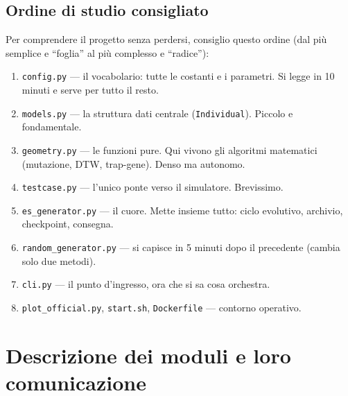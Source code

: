 \documentclass[11pt,a4paper]{report}
\newcommand{\code}[1]{\texttt{#1}}
\begin{document}
\section{Ordine di studio consigliato}
Per comprendere il progetto senza perdersi, consiglio questo ordine
(dal più semplice e ``foglia'' al più complesso e ``radice''):
\begin{enumerate}
  \item \code{config.py} --- il vocabolario: tutte le costanti e i
        parametri. Si legge in 10 minuti e serve per tutto il resto.
  \item \code{models.py} --- la struttura dati centrale
        (\code{Individual}). Piccolo e fondamentale.
  \item \code{geometry.py} --- le funzioni pure. Qui vivono gli algoritmi
        matematici (mutazione, DTW, trap-gene). Denso ma autonomo.
  \item \code{testcase.py} --- l'unico ponte verso il simulatore.
        Brevissimo.
  \item \code{es\_generator.py} --- il cuore. Mette insieme tutto:
        ciclo evolutivo, archivio, checkpoint, consegna.
  \item \code{random\_generator.py} --- si capisce in 5 minuti dopo il
        precedente (cambia solo due metodi).
  \item \code{cli.py} --- il punto d'ingresso, ora che si sa cosa
        orchestra.
  \item \code{plot\_official.py}, \code{start.sh}, \code{Dockerfile}
        --- contorno operativo.
\end{enumerate}

\chapter{Descrizione dei moduli e loro comunicazione}
\end{document}

